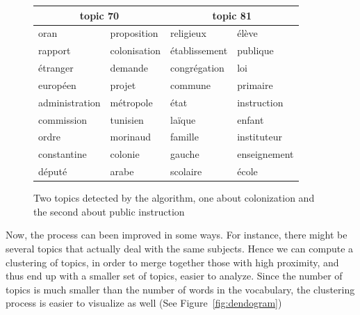 \documentclass[a4paper,11pt]{article}
\begin{document}
\begin{figure}
\begin{center}
\begin{tabular}{|ll|ll|}
	\multicolumn{2}{c}{topic 70} & \multicolumn{2}{c}{topic 81} \\
	\hline
	oran & proposition & religieux & élève\\
	rapport & colonisation & établissement & publique\\
	étranger & demande & congrégation & loi\\
	européen & projet & commune & primaire\\
	administration & métropole & état & instruction\\
	commission & tunisien & laïque & enfant\\
	ordre & morinaud & famille & instituteur\\
	constantine & colonie & gauche & enseignement\\
	député & arabe & scolaire & école\\
	\hline
\end{tabular}
\end{center}
\caption{Two topics detected by the algorithm, one about colonization and the second about public instruction}
\label{topic_words}
\end{figure}

Now, the process can been improved in some ways. For instance, there might be several topics that actually deal with the same subjects. Hence we can compute a clustering of topics, in order to merge together those with high proximity, and thus end up with a smaller set of topics, easier to analyze. Since the number of topics is much smaller than the number of words in the vocabulary, the clustering process is easier to visualize as well (See Figure~\ref{fig:dendogram})
\end{document}
